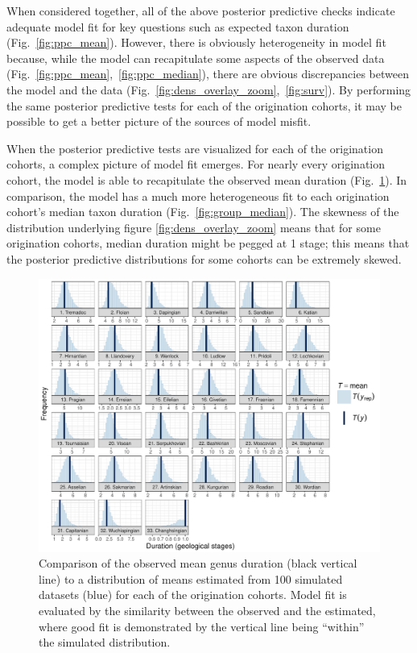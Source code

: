 \documentclass[11pt]{article}
\begin{document}
When considered together, all of the above posterior predictive checks indicate adequate model fit for key questions such as expected taxon duration (Fig.~\ref{fig:ppc_mean}). However, there is obviously heterogeneity in model fit because, while the model can recapitulate some aspects of the observed data (Fig.~\ref{fig:ppc_mean},~\ref{fig:ppc_median}), there are obvious discrepancies between the model and the data (Fig.~\ref{fig:dens_overlay_zoom},~\ref{fig:surv}). By performing the same posterior predictive tests for each of the origination cohorts, it may be possible to get a better picture of the sources of model misfit.

When the posterior predictive tests are visualized for each of the origination cohorts, a complex picture of model fit emerges. For nearly every origination cohort, the model is able to recapitulate the observed mean duration (Fig.~\ref{fig:group_mean}). In comparison, the model has a much more heterogeneous fit to each origination cohort's median taxon duration (Fig.~\ref{fig:group_median}). The skewness of the distribution underlying figure \ref{fig:dens_overlay_zoom} means that for some origination cohorts, median duration might be pegged at 1 stage; this means that the posterior predictive distributions for some cohorts can be extremely skewed. 

\begin{figure}[ht]
  \centering
  \includegraphics[height = 0.5\textheight,width=\textwidth,keepaspectratio=true]{figure/ppc_mean_group_cweib_cens}
  \caption{ Comparison of the observed mean genus duration (black vertical line) to a distribution of means estimated from 100 simulated datasets (blue) for each of the origination cohorts. Model fit is evaluated by the similarity between the observed and the estimated, where good fit is demonstrated by the vertical line being ``within'' the simulated distribution. }
  \label{fig:group_mean}
\end{figure}
\end{document}
